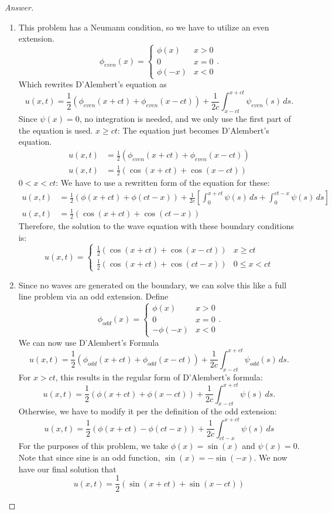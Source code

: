 \documentclass{article}
\theoremstyle{definition}
\renewcommand\qedsymbol{$\blacksquare$}
\newenvironment{ans}{\begin{proof}[Answer]\renewcommand{\qedsymbol}{}}{\end{proof}}
\begin{document}
\begin{ans}
\begin{enumerate}[(1), start=9]
    \item This problem has a Neumann condition, so we have to utilize an even extension.
    \[\phi_{even}(x) = \begin{cases}
        \phi(x) & x > 0\\
        0 & x = 0\\
        \phi(-x) & x < 0
    \end{cases}.\]
    Which rewrites D'Alembert's equation as
    \[u(x,t) = \frac{1}{2}(\phi_{even}(x+ct) + \phi_{even}(x-ct)) + \frac{1}{2c}\int_{x-ct}^{x+ct}\psi_{even}(s)\,ds.\]
    Since $\psi{(x)} = 0$, no integration is needed, and we only use the first part of the equation is used.
    \underline{$x \geq ct$}: The equation just becomes D'Alembert's equation.
    \begin{align*}
        u(x,t) &= \frac{1}{2}(\phi_{even}(x+ct) + \phi_{even}(x-ct))\\
        u(x,t) &= \frac{1}{2}(\cos{(x+ct)} + \cos{(x-ct)})
    \end{align*}
    \underline{$0 < x < ct$}: We have to use a rewritten form of the equation for these:
    \begin{align*}
        u(x,t) &= \frac{1}{2}(\phi(x+ct) + \phi(ct-x)) + \frac{1}{2c}\left[\int_0^{x+ct}\psi(s)\,ds + \int_0^{ct-x}\psi(s)\,ds\right]\\
        u(x,t) &= \frac{1}{2}(\cos{(x+ct)} + \cos{(ct-x)})
    \end{align*}
    Therefore, the solution to the wave equation with these boundary conditions is:
    \[\boxed{u(x,t) = \begin{cases}
        \frac{1}{2}(\cos{(x+ct)} + \cos{(x-ct)}) & x \geq ct\\
        \frac{1}{2}(\cos{(x+ct)} + \cos{(ct-x)}) & 0 \leq x < ct
    \end{cases}}\]

    \item Since no waves are generated on the boundary, we can solve this like a full line problem via an odd extension. Define
    \[\phi_{odd}(x) = \begin{cases}
        \phi(x) & x > 0\\
        0 & x = 0\\
        -\phi(-x) & x < 0
    \end{cases}.\]
    We can now use D'Alembert's Formula
    \[u(x,t) = \frac{1}{2}(\phi_{odd}(x+ct) + \phi_{odd}(x-ct)) + \frac{1}{2c}\int_{x-ct}^{x+ct}\psi_{odd}(s)\,ds.\]
    For $x > ct$, this results in the regular form of D'Alembert's formula:
    \[u(x,t) = \frac{1}{2}(\phi(x+ct) + \phi(x-ct)) + \frac{1}{2c}\int_{x-ct}^{x+ct}\psi(s)\,ds.\]
    Otherwise, we have to modify it per the definition of the odd extension:
    \[u(x,t) = \frac{1}{2}(\phi(x+ct) - \phi(ct-x)) + \frac{1}{2c}\int_{ct-x}^{x+ct}\psi(s)\,ds\]
    For the purposes of this problem, we take $\phi(x) = \sin(x)$ and $\psi(x) = 0$. Note that since sine is an odd function, $\sin(x) = -\sin(-x)$. We now have our final solution that
    \[\boxed{u(x,t) = \frac{1}{2}(\sin(x+ct) + \sin(x-ct))}\]


\end{enumerate}
\end{ans}
\end{document}
